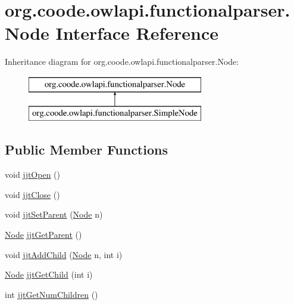 \hypertarget{interfaceorg_1_1coode_1_1owlapi_1_1functionalparser_1_1_node}{\section{org.\-coode.\-owlapi.\-functionalparser.\-Node Interface Reference}
\label{interfaceorg_1_1coode_1_1owlapi_1_1functionalparser_1_1_node}
}
Inheritance diagram for org.\-coode.\-owlapi.\-functionalparser.\-Node\-:\begin{figure}[H]
\begin{center}
\leavevmode
\includegraphics[height=2.000000cm]{interfaceorg_1_1coode_1_1owlapi_1_1functionalparser_1_1_node}
\end{center}
\end{figure}
\subsection*{Public Member Functions}
\begin{DoxyCompactItemize}
\item 
void \hyperlink{interfaceorg_1_1coode_1_1owlapi_1_1functionalparser_1_1_node_a0037ea7795f7fe451b99917db9bac6b6}{jjt\-Open} ()
\item 
void \hyperlink{interfaceorg_1_1coode_1_1owlapi_1_1functionalparser_1_1_node_a9e6407e4233f1d4c384b05cd0af8b44e}{jjt\-Close} ()
\item 
void \hyperlink{interfaceorg_1_1coode_1_1owlapi_1_1functionalparser_1_1_node_aa5a1ec62f2991da3e41beada48c3f99e}{jjt\-Set\-Parent} (\hyperlink{interfaceorg_1_1coode_1_1owlapi_1_1functionalparser_1_1_node}{Node} n)
\item 
\hyperlink{interfaceorg_1_1coode_1_1owlapi_1_1functionalparser_1_1_node}{Node} \hyperlink{interfaceorg_1_1coode_1_1owlapi_1_1functionalparser_1_1_node_a8f07188703e027fed8ffa2ec1fa8b429}{jjt\-Get\-Parent} ()
\item 
void \hyperlink{interfaceorg_1_1coode_1_1owlapi_1_1functionalparser_1_1_node_a2db51307e3f1917e5983e41644195494}{jjt\-Add\-Child} (\hyperlink{interfaceorg_1_1coode_1_1owlapi_1_1functionalparser_1_1_node}{Node} n, int i)
\item 
\hyperlink{interfaceorg_1_1coode_1_1owlapi_1_1functionalparser_1_1_node}{Node} \hyperlink{interfaceorg_1_1coode_1_1owlapi_1_1functionalparser_1_1_node_a87afd618c6b7b9d23885df3daa43555b}{jjt\-Get\-Child} (int i)
\item 
int \hyperlink{interfaceorg_1_1coode_1_1owlapi_1_1functionalparser_1_1_node_a0e374990663daf54b825a2be5c456041}{jjt\-Get\-Num\-Children} ()
\end{DoxyCompactItemize}



